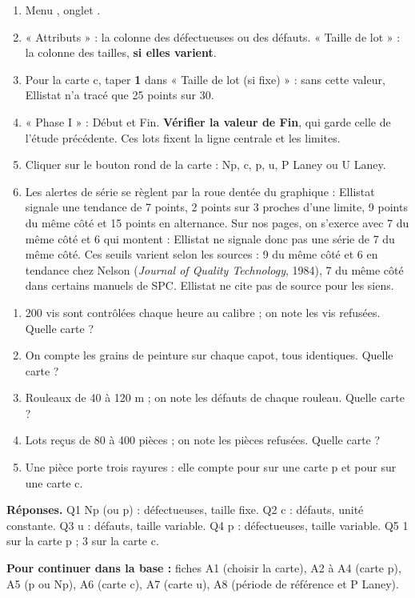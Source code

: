\documentclass[10pt,a4paper]{article}
\begin{document}
\begin{enumerate}[label=\textcolor{cyan}{\textbf{\arabic*.}},leftmargin=15pt,itemsep=1.5pt]
\item Menu , onglet .
\item « Attributs » : la colonne des défectueuses ou des défauts. « Taille de lot » : la colonne des tailles, \textbf{si elles varient}.
\item Pour la carte c, taper \textbf{1} dans « Taille de lot (si fixe) » : sans cette valeur, Ellistat n'a tracé que 25 points sur 30.
\item « Phase I » : Début et Fin. \textbf{Vérifier la valeur de Fin}, qui garde celle de l'étude précédente. Ces lots fixent la ligne centrale et les limites.
\item Cliquer sur le bouton rond de la carte : Np, c, p, u, P Laney ou U Laney.
\item Les alertes de série se règlent par la roue dentée du graphique : Ellistat signale une tendance de 7 points, 2 points sur 3 proches d'une limite, 9 points du même côté et 15 points en alternance. Sur nos pages, on s'exerce avec 7 du même côté et 6 qui montent : Ellistat ne signale donc pas une série de 7 du même côté. Ces seuils varient selon les sources : 9 du même côté et 6 en tendance chez Nelson (\textit{Journal of Quality Technology}, 1984), 7 du même côté dans certains manuels de SPC. Ellistat ne cite pas de source pour les siens.
\end{enumerate}

\begin{enumerate}[label=\textcolor{cyan}{\textbf{Q\arabic*.}},leftmargin=22pt,itemsep=2pt]
\item 200 vis sont contrôlées chaque heure au calibre ; on note les vis refusées. Quelle carte ? \champ{20mm}
\item On compte les grains de peinture sur chaque capot, tous identiques. Quelle carte ? \champ{20mm}
\item Rouleaux de 40 à 120 m ; on note les défauts de chaque rouleau. Quelle carte ? \champ{20mm}
\item Lots reçus de 80 à 400 pièces ; on note les pièces refusées. Quelle carte ? \champ{20mm}
\item Une pièce porte trois rayures : elle compte pour \champ{8mm} sur une carte p et pour \champ{8mm} sur une carte c.
\end{enumerate}
\begin{tcolorbox}[colback=gray!8,colframe=gray!60,boxrule=0.5pt,arc=2pt,left=6pt,right=6pt,top=3pt,bottom=3pt]\footnotesize\textbf{Réponses.} Q1 Np (ou p) : défectueuses, taille fixe. Q2 c : défauts, unité constante. Q3 u : défauts, taille variable. Q4 p : défectueuses, taille variable. Q5 1 sur la carte p ; 3 sur la carte c.\end{tcolorbox}

\vfill{\footnotesize\color{uimm}\textbf{Pour continuer dans la base :} fiches A1 (choisir la carte), A2 à A4 (carte p), A5 (p ou Np), A6 (carte c), A7 (carte u), A8 (période de référence et P Laney).}
\end{document}

